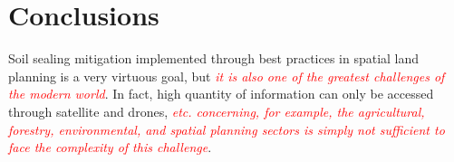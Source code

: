 \documentclass[APA,LATO1COL,doublespace]{WileyNJD-v2}
\newcommand{\toberevised}[1]{\emph{\textcolor{red}{#1}}} %
\begin{document}





\section{Conclusions}
Soil sealing mitigation implemented through best practices in spatial land planning is a very virtuous goal, but \toberevised{it is also one of the greatest challenges of the modern world}. 
In fact, high quantity of information can only be accessed through satellite and drones, \toberevised{etc. concerning, for example, the agricultural, forestry, environmental, and spatial planning sectors is simply not sufficient to face the complexity of this challenge}.
\end{document}
